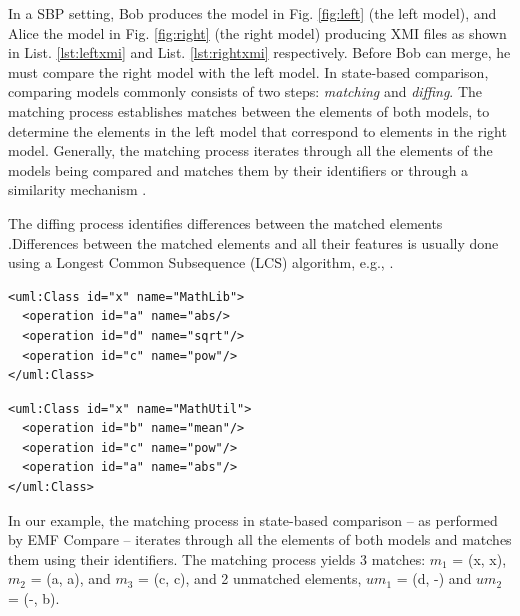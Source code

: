 \documentclass{jot}
\begin{document}
    
    In a SBP setting, Bob produces the model in Fig. \ref{fig:left} (the left model), and Alice the model in Fig. \ref{fig:right} (the right model) producing XMI files as shown in List. \ref{lst:leftxmi} and List. \ref{lst:rightxmi} respectively.
    Before Bob can merge, he must compare the right model with the left model.
    In state-based comparison, comparing models commonly consists of two steps: \emph{matching} and \emph{diffing}.
    The matching process establishes matches between the elements of both models, to determine the elements in the left model that correspond to elements in the right model.
    Generally, the matching process iterates through all the elements of the models being compared and matches them by their identifiers or through a similarity mechanism  \cite{DBLP:conf/sfm/BroschKLSWW12,emfcompare2018developer}.
    
    The diffing process identifies differences between the matched elements \cite{DBLP:conf/sfm/BroschKLSWW12,emfcompare2018developer}.Differences between the matched elements and all their features is usually done using a Longest Common Subsequence (LCS) algorithm, e.g., \cite{DBLP:journals/algorithmica/Meyers86}.
    
\vspace{-10pt}
\begin{minipage}[t]{0.49\linewidth} 
\begin{lstlisting}[style=eol,caption={The simplified XMI of the left model in Fig. \ref{fig:left}.},label=lst:leftxmi]
<uml:Class id="x" name="MathLib">
  <operation id="a" name="abs/>
  <operation id="d" name="sqrt"/>
  <operation id="c" name="pow"/>
</uml:Class>
\end{lstlisting}
\end{minipage}
\hfill
\begin{minipage}[t]{0.49\linewidth}
\begin{lstlisting}[style=eol,caption={The simplified XMI of the right model in Fig. \ref{fig:right}.},label=lst:rightxmi]
<uml:Class id="x" name="MathUtil">
  <operation id="b" name="mean"/>
  <operation id="c" name="pow"/>
  <operation id="a" name="abs"/>
</uml:Class>
\end{lstlisting}
\end{minipage}
    
    In our example, the matching process in state-based comparison -- as performed by EMF Compare \cite{emfcompare2018developer} -- iterates through all the elements of both models and matches them using their identifiers. The matching process yields 3 matches: $m_1$ = (\textsf{x}, \textsf{x}), $m_2$ = (\textsf{a}, \textsf{a}), and $m_3$ = (\textsf{c}, \textsf{c}), and 2 unmatched elements, $um_1$ = (\textsf{d}, -) and $um_2$ = (-, \textsf{b}). 
    
\end{document}
